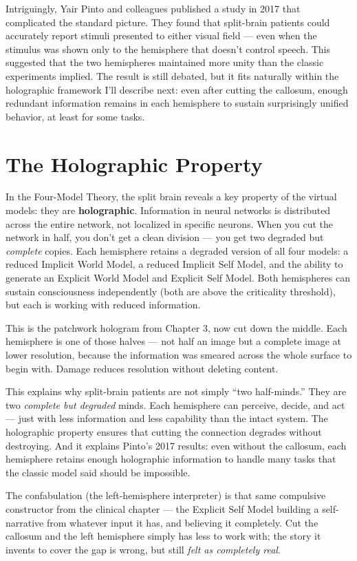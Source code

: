 \documentclass[11pt, twoside, openright]{book}
\begin{document}
Intriguingly, Yair Pinto and colleagues published a study in 2017 that complicated the standard picture. They found that split-brain patients could accurately report stimuli presented to either visual field --- even when the stimulus was shown only to the hemisphere that doesn't control speech. This suggested that the two hemispheres maintained more unity than the classic experiments implied. The result is still debated, but it fits naturally within the holographic framework I'll describe next: even after cutting the callosum, enough redundant information remains in each hemisphere to sustain surprisingly unified behavior, at least for some tasks.

\section*{The Holographic Property}

In the Four-Model Theory, the split brain reveals a key property of the virtual models: they are \textbf{holographic}. Information in neural networks is distributed across the entire network, not localized in specific neurons. When you cut the network in half, you don't get a clean division --- you get two degraded but \textit{complete} copies. Each hemisphere retains a degraded version of all four models: a reduced Implicit World Model, a reduced Implicit Self Model, and the ability to generate an Explicit World Model and Explicit Self Model. Both hemispheres can sustain consciousness independently (both are above the criticality threshold), but each is working with reduced information.

This is the patchwork hologram from Chapter 3, now cut down the middle. Each hemisphere is one of those halves --- not half an image but a complete image at lower resolution, because the information was smeared across the whole surface to begin with. Damage reduces resolution without deleting content.

This explains why split-brain patients are not simply ``two half-minds.'' They are two \textit{complete but degraded} minds. Each hemisphere can perceive, decide, and act --- just with less information and less capability than the intact system. The holographic property ensures that cutting the connection degrades without destroying. And it explains Pinto's 2017 results: even without the callosum, each hemisphere retains enough holographic information to handle many tasks that the classic model said should be impossible.

The confabulation (the left-hemisphere interpreter) is that same compulsive constructor from the clinical chapter --- the Explicit Self Model building a self-narrative from whatever input it has, and believing it completely. Cut the callosum and the left hemisphere simply has less to work with; the story it invents to cover the gap is wrong, but still \textit{felt as completely real}.
\end{document}
